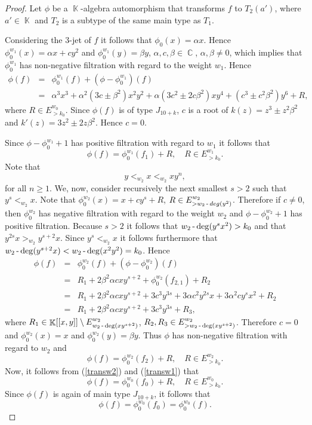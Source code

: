 \documentclass[noend]{amsproc}
\theoremstyle{definition}
\DeclareMathOperator{\C}{\mathbb{C}}
\DeclareMathOperator{\K}{\mathbb{K}}
\DeclareMathOperator{\dash}{\textnormal{-}}
\begin{document}
\begin{proof}
Let $\phi$ be a $\K$-algebra automorphism that transforms $f$ to $T_2(a')$, where $a'\in\K$ and $T_2$ is a subtype of the same main type as $T_1$.

Considering the $3$-jet of $f$ it follows that $\phi_0(x)=\alpha x$. Hence $\phi_0^{w_1}(x)=\alpha x+cy^2$ and $\phi_0^{w_1}(y)=\beta y$, $\alpha, c,\beta\in\C$, $\alpha,\beta\neq 0$, which implies that $\phi^{w_1}_0$ has non-negative filtration with regard to the weight $w_1$.  Hence
\begin{eqnarray*}
\phi(f)&=&\phi^{w_1}_0(f)+(\phi-\phi^{w_1}_0)(f)\\
&=&\alpha^3x^3+\alpha^2(3c\pm\beta^2)x^2y^2+\alpha(3c^2\pm2 c\beta^2)xy^4+(c^3\pm c^2\beta^2)y^6+R,
\end{eqnarray*}
where $R\in E^{w_0}_{>k_0}$. Since $\phi(f)$ is of type $J_{10+k}$, $c$ is a root of $k(z)=z^3\pm z^2\beta^2$ and $k'(z)=3z^2\pm2 z\beta^2$. Hence $c=0$.  

Since $\phi-\phi_0^{w_1}+1$ has positive filtration with regard to $w_1$ it follows that 
\begin{equation}\label{transw2}
\phi(f) = \phi_0^{w_1}(f_1) + R,\quad R\in E^{w_1}_{>k_0}.
\end{equation}
Note that 
\begin{equation}\label{orderw1}
y<_{w_2}x<_{w_2}xy^n,
\end{equation}
for all $n\ge 1$. We, now, consider recursively the next smallest $s>2$ such that $y^s<_{w_2}x$. Note that $\phi_0^{w_2}(x)=x+cy^s+R$, $R\in E^{w_2}_{>w_2\dash deg(y^2)}$. Therefore if $c\neq 0$, then $\phi_0^{w_2}$ has negative filtration with regard to the weight $w_2$ and $\phi-\phi_0^{w_2}+1$ has positive filtration. Because $s>2$ it follows that $w_2\dash\deg(y^sx^2)>k_0$ and that $y^{2s}x>_{w_2}y^{s+2}x$. Since $y^s<_{w_2}x$ it follows furthermore that $w_2\dash\deg(y^{s+2}x)<w_2\dash\deg(x^2y^2)=k_0$. Hence
\begin{eqnarray*}
\phi(f) &=& \phi_0^{w_2}(f)+(\phi-\phi_0^{w_2})(f)\\
 &=&  R_1+2\beta^2\alpha c xy^{s+2}+\phi_0^{w_2}(f_{2,1})+R_2\\
&=&R_1+2\beta^2\alpha c xy^{s+2}+ 3 c^3y^{3s}+ 3\alpha c^2y^{2s}x+3\alpha^2 cy^sx^2+R_2\\
&=&R_1+2\beta^2\alpha c xy^{s+2}+ 3c^3y^{3s}+R_3,
\end{eqnarray*}
where $R_1\in\K[[x,y]]\setminus E^{w_2}_{w_2\dash\deg(xy^{s+2})}$, $R_2, R_3\in E^{w_2}_{>w_2\dash\deg(xy^{s+2})}$. Therefore $c=0$ and $\phi_0^{w_2}(x)=x$ and $\phi_0^{w_2}(y)=\beta y$. Thus $\phi$ has non-negative filtration with regard to $w_2$ and
\begin{equation}\label{transw1}
\phi(f) = \phi_0^{w_2}(f_2)+R,\quad R\in E^{w_2}_{>k_0}.
\end{equation}
Now, it follows from (\ref{transw2}) and (\ref{transw1}) that 
\begin{equation*}
\phi(f) = \phi_0^{w_0}(f_0)+R,\quad R\in E^{w_0}_{>k_0}.
\end{equation*}
Since $\phi(f)$ is again of main type $J_{10+k}$, it follows that
\begin{equation*}
\phi(f) = \phi_0^{w_0}(f_0)=\phi_0^{w_0}(f).
\end{equation*}


\end{proof}
\end{document}
